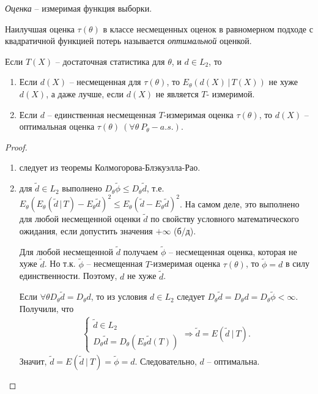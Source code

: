 \begin{definition}
    \textit{Оценка} -- измеримая функция выборки.
\end{definition}
\begin{definition}
    Наилучшая оценка $\tau(\theta)$ в классе несмещенных оценок в равномерном подходе с квадратичной функцией потерь называется \textit{оптимальной} оценкой.
\end{definition}
\begin{corollary}
    Если $T(X)$ -- достаточная статистика для $\theta$, и $d\in L_2$, то
    \begin{enumerate}
        \item Если $d(X)$ -- несмещенная для $\tau(\theta)$, то $E_\theta(d(X)\, \vert\, T(X))$ не хуже $d(X)$, а даже лучше, если $d(X)$ не является $T$- измеримой.
        \item Если $d$ -- единственная несмещенная $T$-измеримая оценка $\tau(\theta)$, то $d(X)$ -- оптимальная оценка $\tau(\theta)\ (\forall \theta\ P_\theta-a.s.)$.
    \end{enumerate}
\end{corollary}
\begin{proof} ~
    \begin{enumerate}
        \item следует из теоремы Колмогорова-Блэкуэлла-Рао.
        \item для $\widetilde{d} \in L_2$ выполнено $D_\theta\widetilde{\phi} \leq D_\theta\widetilde{d}$, т.е. $E_\theta\left(E_\theta\left(\widetilde{d}\, \vert\, T\right) - E_\theta\widetilde{d}\right)^2 \leq E_\theta\left(\widetilde{d} - E_\theta\widetilde{d}\right)^2$. На самом деле, это выполнено для любой несмещенной оценки $\widetilde{d}$ по свойству условного математического ожидания, если допустить значения $+\infty$ (б/д).
        
        Для любой несмещенной $\widetilde{d}$ получаем $\widetilde{\phi}$ -- несмещенная оценка, которая не хуже $\widetilde{d}$. Но т.к. $\widetilde{\phi}$ -- несмещенная $T$-измеримая оценка $\tau(\theta)$, то $\widetilde{\phi} = d$ в силу единственности. Поэтому, $d$ не хуже $\widetilde{d}$.
        
        Если $\forall \theta D_\theta\widetilde{d} = D_\theta d$, то из условия $d \in L_2$ следует $D_\theta\widetilde{d} = D_\theta d = D_\theta\widetilde{\phi} < \infty$. Получили, что
        \begin{gather*}
            \begin{cases}
                \tilde{d} \in L_{2}\\
                D_{\theta }\tilde{d} =D_{\theta }\left( E_{\theta }\tilde{d}( T)\right)
            \end{cases} \Rightarrow \tilde{d} =E\left(\tilde{d} \ |\ T\right).
        \end{gather*}
        Значит, $\displaystyle \tilde{d} =E\left(\tilde{d} \ |\ T\right) =\tilde{\phi } =d$. Следовательно, $\displaystyle d$ -- оптимальна.
    \end{enumerate}
\end{proof}


    